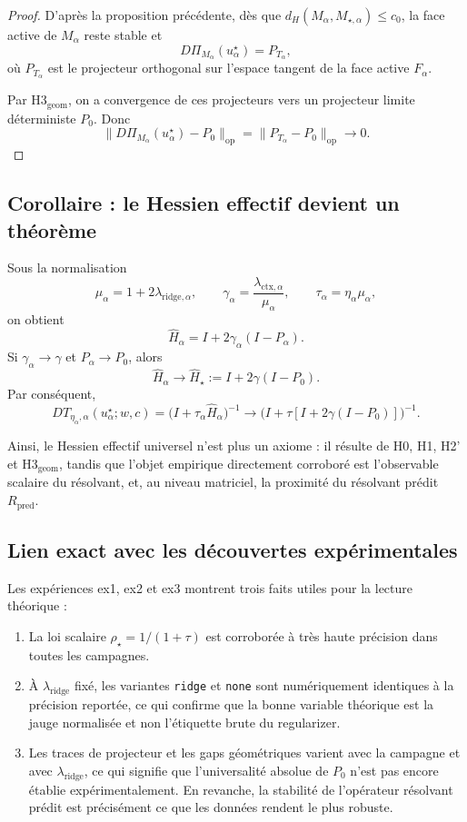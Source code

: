 \begin{proof}
D'après la proposition précédente, dès que \(d_H(M_\alpha,M_{\star,\alpha})\le c_0\), la face active de \(M_\alpha\) reste stable et
\[
D\Pi_{M_\alpha}(u_\alpha^\star)=P_{T_\alpha},
\]
où \(P_{T_\alpha}\) est le projecteur orthogonal sur l'espace tangent de la face active \(F_\alpha\).

Par H3\(_{\mathrm{geom}}\), on a convergence de ces projecteurs vers un projecteur limite déterministe \(P_0\). Donc
\[
\|D\Pi_{M_\alpha}(u_\alpha^\star)-P_0\|_{\mathrm{op}}
=
\|P_{T_\alpha}-P_0\|_{\mathrm{op}}
\to 0.
\]
\end{proof}

\subsection{Corollaire : le Hessien effectif devient un théorème}

Sous la normalisation
\[
\mu_\alpha=1+2\lambda_{\mathrm{ridge},\alpha},\qquad
\gamma_\alpha=\frac{\lambda_{\mathrm{ctx},\alpha}}{\mu_\alpha},\qquad
\tau_\alpha=\eta_\alpha\mu_\alpha,
\]
on obtient
\[
\widehat H_\alpha
=
I+2\gamma_\alpha(I-P_\alpha).
\]
Si \(\gamma_\alpha\to\gamma\) et \(P_\alpha\to P_0\), alors
\[
\widehat H_\alpha\to \widehat H_\star:=I+2\gamma(I-P_0).
\]
Par conséquent,
\[
DT_{\eta_\alpha,\alpha}(u_\alpha^\star;w,c)
=
\bigl(I+\tau_\alpha\widehat H_\alpha\bigr)^{-1}
\to
\bigl(I+\tau[I+2\gamma(I-P_0)]\bigr)^{-1}.
\]

Ainsi, le Hessien effectif universel n'est plus un axiome : il résulte de H0, H1, H2' et H3\(_{\mathrm{geom}}\), tandis que l'objet empirique directement corroboré est l'observable scalaire du résolvant, et, au niveau matriciel, la proximité du résolvant prédit \(R_{\mathrm{pred}}\).

\subsection{Lien exact avec les découvertes expérimentales}

Les expériences ex1, ex2 et ex3 montrent trois faits utiles pour la lecture théorique :

\begin{enumerate}
    \item La loi scalaire \(\rho_\star=1/(1+\tau)\) est corroborée à très haute précision dans toutes les campagnes.
    \item À \(\lambda_{\mathrm{ridge}}\) fixé, les variantes \texttt{ridge} et \texttt{none} sont numériquement identiques à la précision reportée, ce qui confirme que la bonne variable théorique est la jauge normalisée et non l'étiquette brute du regularizer.
    \item Les traces de projecteur et les gaps géométriques varient avec la campagne et avec \(\lambda_{\mathrm{ridge}}\), ce qui signifie que l'universalité absolue de \(P_0\) n'est pas encore établie expérimentalement. En revanche, la stabilité de l'opérateur résolvant prédit est précisément ce que les données rendent le plus robuste.
\end{enumerate}

